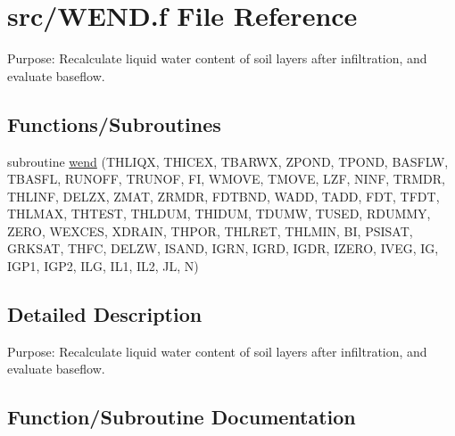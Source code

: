 \hypertarget{WEND_8f}{}\section{src/\+W\+E\+N\+D.f File Reference}
\label{WEND_8f}


Purpose\+: Recalculate liquid water content of soil layers after infiltration, and evaluate baseflow.  


\subsection*{Functions/\+Subroutines}
\begin{DoxyCompactItemize}
\item 
subroutine \hyperlink{WEND_8f_aef71fcd76a2c9c23bd3d07a80231ca8b}{wend} (T\+H\+L\+I\+Q\+X, T\+H\+I\+C\+E\+X, T\+B\+A\+R\+W\+X, Z\+P\+O\+N\+D, T\+P\+O\+N\+D, B\+A\+S\+F\+L\+W, T\+B\+A\+S\+F\+L, R\+U\+N\+O\+F\+F, T\+R\+U\+N\+O\+F, F\+I, W\+M\+O\+V\+E, T\+M\+O\+V\+E, L\+Z\+F, N\+I\+N\+F, T\+R\+M\+D\+R, T\+H\+L\+I\+N\+F, D\+E\+L\+Z\+X, Z\+M\+A\+T, Z\+R\+M\+D\+R, F\+D\+T\+B\+N\+D, W\+A\+D\+D, T\+A\+D\+D, F\+D\+T, T\+F\+D\+T, T\+H\+L\+M\+A\+X, T\+H\+T\+E\+S\+T, T\+H\+L\+D\+U\+M, T\+H\+I\+D\+U\+M, T\+D\+U\+M\+W, T\+U\+S\+E\+D, R\+D\+U\+M\+M\+Y, Z\+E\+R\+O, W\+E\+X\+C\+E\+S, X\+D\+R\+A\+I\+N, T\+H\+P\+O\+R, T\+H\+L\+R\+E\+T, T\+H\+L\+M\+I\+N, B\+I, P\+S\+I\+S\+A\+T, G\+R\+K\+S\+A\+T, T\+H\+F\+C, D\+E\+L\+Z\+W, I\+S\+A\+N\+D, I\+G\+R\+N, I\+G\+R\+D, I\+G\+D\+R, I\+Z\+E\+R\+O, I\+V\+E\+G, I\+G, I\+G\+P1, I\+G\+P2, I\+L\+G, I\+L1, I\+L2, J\+L, N)
\end{DoxyCompactItemize}


\subsection{Detailed Description}
Purpose\+: Recalculate liquid water content of soil layers after infiltration, and evaluate baseflow. 



\subsection{Function/\+Subroutine Documentation}
\hypertarget{WEND_8f_aef71fcd76a2c9c23bd3d07a80231ca8b}{}
